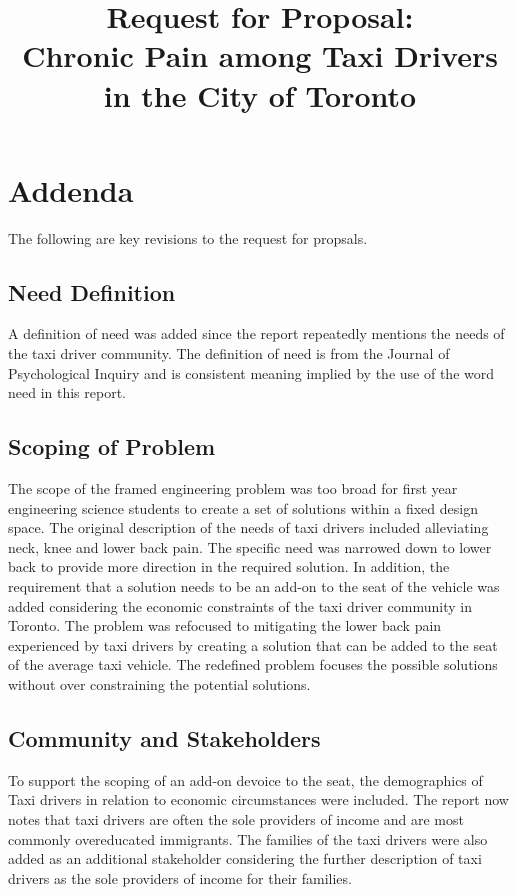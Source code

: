 \documentclass[11pt]{article}
\begin{document}
\title{Request for Proposal: \\Chronic Pain among Taxi Drivers in the
  City of Toronto}
\maketitle
\begin{abstract}

\end{abstract}
\newpage
\tableofcontents
\newpage
\section{Addenda} 
\label{sec:toadd}
The following are key revisions to the request for propsals. 

\subsection{Need Definition}
\label{sec:needdef}
A definition of need was added since the report repeatedly mentions the 
needs of the taxi driver community. The definition of need is from the 
Journal of Psychological Inquiry and is consistent meaning implied by 
the use of the word need in this report. 

\subsection{Scoping of Problem}
\label{sec:scoping}
The scope of the framed engineering problem was too broad for first year 
engineering science students to create a set of solutions within a fixed 
design space. The original description of the needs of taxi drivers included 
alleviating neck, knee and lower back pain. The specific need was narrowed 
down to lower back to provide more direction in the required solution. 
In addition, the requirement that a solution needs to be an add-on to the 
seat of the vehicle was added considering the economic constraints of the 
taxi driver community in Toronto. The problem was refocused to mitigating 
the lower back pain experienced by taxi drivers by creating a solution that 
can be added to the seat of the average taxi vehicle. The redefined problem 
focuses the possible solutions without over constraining the potential solutions. 

\subsection{Community and Stakeholders}
\label{sec:comm and stake}
To support the scoping of an add-on devoice to the seat, the demographics of 
Taxi drivers in relation to economic circumstances were included.  The report 
now notes that taxi drivers are often the sole providers of income and are most 
commonly overeducated immigrants. The families of the taxi drivers were also added 
as an additional stakeholder considering the further description of taxi drivers as 
the sole providers of income for their families. 
\end{document}
